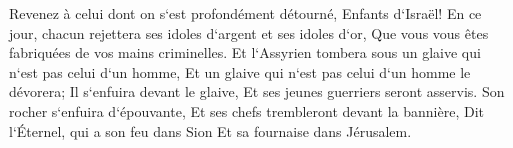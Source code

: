 \verse Revenez à celui dont on s`est profondément détourné, Enfants d`Israël! 
\verse En ce jour, chacun rejettera ses idoles d`argent et ses idoles d`or, Que vous vous êtes fabriquées de vos mains criminelles. 
\verse Et l`Assyrien tombera sous un glaive qui n`est pas celui d`un homme, Et un glaive qui n`est pas celui d`un homme le dévorera; Il s`enfuira devant le glaive, Et ses jeunes guerriers seront asservis. 
\verse Son rocher s`enfuira d`épouvante, Et ses chefs trembleront devant la bannière, Dit l`Éternel, qui a son feu dans Sion Et sa fournaise dans Jérusalem. 

\chapter{}

